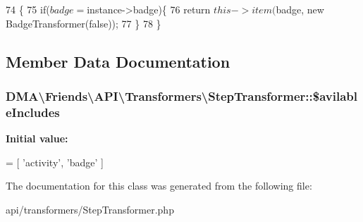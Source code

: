 \begin{DoxyCode}
74     \{
75         \textcolor{keywordflow}{if}($badge = $instance->badge)\{
76             \textcolor{keywordflow}{return} $this->item($badge, \textcolor{keyword}{new} BadgeTransformer(\textcolor{keyword}{false}));
77         \}
78     \}
\end{DoxyCode}


\subsection{Member Data Documentation}
\hypertarget{classDMA_1_1Friends_1_1API_1_1Transformers_1_1StepTransformer_a314810a5358b5eec093a7975e443ec37}{}
\subsubsection[{\$avilable\+Includes}]{\setlength{\rightskip}{0pt plus 5cm}D\+M\+A\textbackslash{}\+Friends\textbackslash{}\+A\+P\+I\textbackslash{}\+Transformers\textbackslash{}\+Step\+Transformer\+::\$avilable\+Includes\hspace{0.3cm}{\ttfamily [protected]}}\label{classDMA_1_1Friends_1_1API_1_1Transformers_1_1StepTransformer_a314810a5358b5eec093a7975e443ec37}
{\bfseries Initial value\+:}
\begin{DoxyCode}
= [
            \textcolor{stringliteral}{'activity'},
            \textcolor{stringliteral}{'badge'}
    ]
\end{DoxyCode}


The documentation for this class was generated from the following file\+:\begin{DoxyCompactItemize}
\item 
api/transformers/Step\+Transformer.\+php\end{DoxyCompactItemize}
